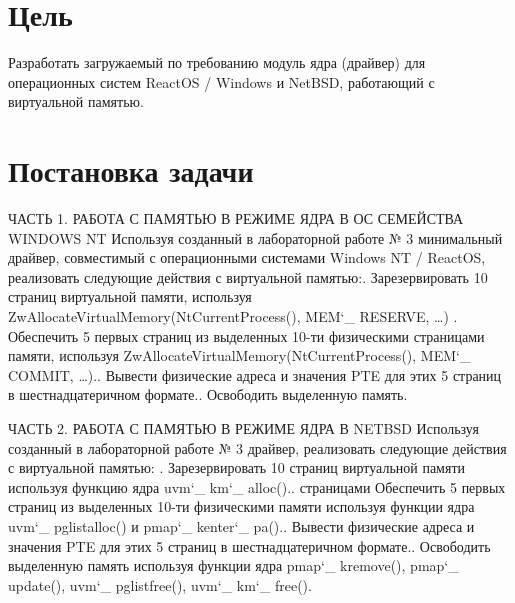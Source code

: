 \documentclass[a4paper, 14pt]{extarticle}
\begin{document}
\section{Цель} \label{sec:Goal}
\begin{flushleft}
Разработать загружаемый по требованию модуль ядра
(драйвер) для операционных систем ReactOS / Windows и NetBSD, работающий
с виртуальной памятью.

\end{flushleft}
\pagebreak

\section{Постановка задачи} \label{sec:ToDo}
\begin{flushleft}
ЧАСТЬ 1. РАБОТА С ПАМЯТЬЮ В РЕЖИМЕ ЯДРА В ОС СЕМЕЙСТВА
WINDOWS NT \newline \newline
Используя созданный в лабораторной работе № 3 минимальный драйвер,
совместимый с операционными системами Windows NT / ReactOS, реализовать
следующие действия с виртуальной памятью:. Зарезервировать 10 страниц виртуальной памяти, используя
ZwAllocateVirtualMemory(NtCurrentProcess(), MEM\char`_ RESERVE, …) . Обеспечить 5 первых страниц из выделенных 10-ти физическими
страницами
памяти,
используя
ZwAllocateVirtualMemory(NtCurrentProcess(),
MEM\char`_ COMMIT, …).. Вывести физические адреса и значения PTE для этих 5 страниц в
шестнадцатеричном формате.. Освободить выделенную память.\newline

ЧАСТЬ 2. РАБОТА С ПАМЯТЬЮ В РЕЖИМЕ ЯДРА В NETBSD \newline \newline
Используя созданный в лабораторной работе № 3 драйвер, реализовать
следующие действия с виртуальной памятью: .
Зарезервировать
10
страниц
виртуальной
памяти
используя
функцию ядра uvm\char`_ km\char`_ alloc()..
страницами
Обеспечить 5 первых страниц из выделенных 10-ти физическими
памяти
используя
функции
ядра
uvm\char`_ pglistalloc()
и
pmap\char`_ kenter\char`_ pa()..
Вывести физические адреса и значения PTE для этих 5 страниц в
шестнадцатеричном формате..
Освободить
выделенную
память
используя
функции
ядра
pmap\char`_ kremove(), pmap\char`_ update(), uvm\char`_ pglistfree(), uvm\char`_ km\char`_ free().\newline

\end{flushleft}
\pagebreak
\end{document}
